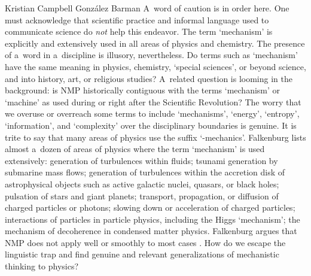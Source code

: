 \begin{recengenv}{Kristian Campbell González Barman}
A~word of caution is in order here. One must acknowledge that scientific practice and informal language used to communicate science do \textit{not} help this endeavor. The term ‘mechanism' is explicitly and extensively used in all areas of physics and chemistry. The presence of a~word in a~discipline is illusory, nevertheless. Do terms such as ‘mechanism' have the same meaning in physics, chemistry, ‘special sciences', or beyond science, and into history, art, or religious studies? A~related question is looming in the background: is NMP historically contiguous with the terms ‘mechanism' or ‘machine' as used during or right after the Scientific Revolution? The worry that we overuse or overreach some terms to include ‘mechanisms', ‘energy', ‘entropy', ‘information', and ‘complexity' over the disciplinary boundaries is genuine. It is trite to say that many areas of physics use the suffix ‘-mechanics'. Falkenburg lists almost a~dozen of areas of physics where the term ‘mechanism' is used extensively: generation of turbulences within fluids; tsunami generation by submarine mass flows; generation of turbulences within the accretion disk of astrophysical objects such as active galactic nuclei, quasars, or black holes; pulsation of stars and giant planets; transport, propagation, or diffusion of charged particles or photons; slowing down or acceleration of charged particles; interactions of particles in particle physics, including the Higgs ‘mechanism'; the mechanism of decoherence in condensed matter physics. Falkenburg argues that NMP does not apply well or smoothly to most cases
\parencite[][pp.84–85]{falkenburg_mechanistic_2019}. %
 How do we escape the linguistic trap and find genuine and relevant generalizations of mechanistic thinking to physics?


\end{recengenv}
